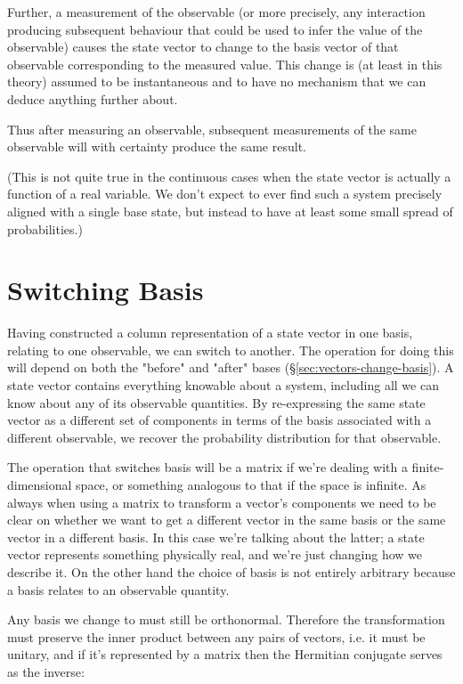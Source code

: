 Further, a measurement of the observable (or more precisely, any interaction producing subsequent behaviour that could be used to infer the value of the observable) causes the state vector to change to the basis vector of that observable corresponding to the measured value. This change is (at least in this theory) assumed to be instantaneous and to have no mechanism that we can deduce anything further about.

Thus after measuring an observable, subsequent measurements of the same observable will with certainty produce the same result.

(This is not quite true in the continuous cases when the state vector is actually a function of a real variable. We don't expect to ever find such a system precisely aligned with a single base state, but instead to have at least some small spread of probabilities.)

\section{Switching Basis}

Having constructed a column representation of a state vector in one basis, relating to one observable, we can switch to another. The operation for doing this will depend on both the "before" and "after" bases (§\ref{sec:vectors-change-basis}). A state vector contains everything knowable about a system, including all we can know about any of its observable quantities. By re-expressing the same state vector as a different set of components in terms of the basis associated with a different observable, we recover the probability distribution for that observable.

The operation that switches basis will be a matrix if we're dealing with a finite-dimensional space, or something analogous to that if the space is infinite. As always when using a matrix to transform a vector's components we need to be clear on whether we want to get a different vector in the same basis or the same vector in a different basis. In this case we're talking about the latter; a state vector represents something physically real, and we're just changing how we describe it. On the other hand the choice of basis is not entirely arbitrary because a basis relates to an observable quantity.

Any basis we change to must still be orthonormal. Therefore the transformation must preserve the inner product between any pairs of vectors, i.e. it must be unitary, and if it's represented by a matrix then the Hermitian conjugate serves as the inverse:

